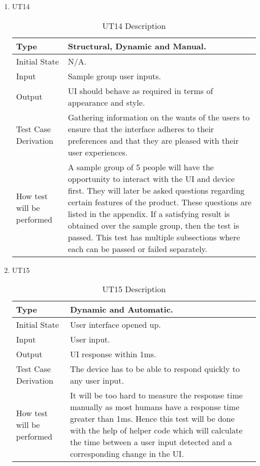 \documentclass[12pt, titlepage]{article}
\begin{document}
\begin{enumerate}

\item{UT14}
\begin{table}[H]
    \caption{UT14 Description}
\begin{tabular}{ |p{5cm}||p{7cm}| }
    \hline
    Type & Structural, Dynamic and Manual. \\
    \hline
    Initial State  &  N/A. \\
    \hline
    Input &   Sample group user inputs. \\
    \hline
    Output &   UI should behave as required in terms of appearance and style.  \\
    \hline
    Test Case Derivation &   Gathering information on the wants of the users to ensure that the interface adheres to their preferences and that they are pleased with their user experiences. \\
    \hline
    How test will be performed & A sample group of 5 people will have the opportunity to interact with the UI and device first. They will later be asked questions regarding certain features of the product. These questions are listed in the appendix. If a satisfying result is obtained over the sample group, then the test is passed. This test has multiple subsections where each can be passed or failed separately. \\
    \hline
\end{tabular}
\end{table}
\item{UT15}
\begin{table}[H]
    \caption{UT15 Description}
\begin{tabular}{ |p{5cm}||p{7cm}| }
    \hline
    Type & Dynamic and Automatic. \\
    \hline
    Initial State  &  User interface opened up. \\
    \hline
    Input &   User input. \\
    \hline
    Output &   UI response within 1ms.  \\
    \hline
    Test Case Derivation &   The device has to be able to respond quickly to any user input. \\
    \hline
    How test will be performed & It will be too hard to measure the response time manually as most humans have a response time greater than 1ms. Hence this test will be done with the help of helper code which will calculate the time between a user input detected and a corresponding change in the UI. \\

\end{tabular}
\end{table}
\end{enumerate}
\end{document}
